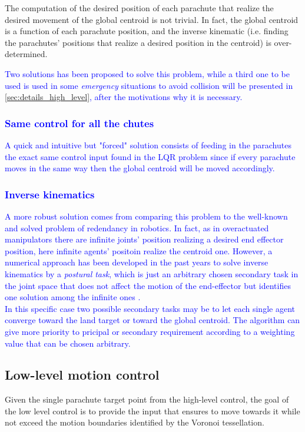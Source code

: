 The computation of the desired position of each parachute that realize the desired movement of the global centroid is not trivial. In fact, the global centroid is a function of each parachute position, and the inverse kinematic (i.e. finding the parachutes' positions that realize a desired position in the centroid) is over-determined. \textcolor{blue}{Two solutions has been proposed to solve this problem, while a third one to be used is used in some \textit{emergency} situations to avoid collision will be presented in \autoref{sec:details_high_level}, after the motivations why it is necessary.
\subsubsection{Same control for all the chutes}
 A quick and intuitive but "forced" solution consists of feeding in the parachutes the exact same control input found in the LQR problem since if every parachute moves in the same way then the global centroid will be moved accordingly.
 \subsubsection{Inverse kinematics}
  A more robust solution comes from comparing this problem to the well-known and solved problem of redendancy in robotics. In fact, as in overactuated manipulators there are infinite joints' position realizing a desired end effector position, here infinite agents' positoin realize the centroid one. However, a numerical approach has been developed in the past years to solve inverse kinematics by a \textit{postural task}, which is just an arbitrary chosen secondary task in the joint space that does not affect the motion of the end-effector  but identifies one solution among the infinite ones \cite{b5} \cite{b6}.\\
In this specific case two possible secondary tasks may be to let each single agent converge toward the land target or toward the global centroid. The algorithm can give more priority to pricipal or secondary requirement  according to a weighting value that can be chosen arbitrary.}

\subsection{Low-level motion control}
Given the single parachute target point from the high-level control, the goal of the low level control is to provide the input that ensures to move towards it while not exceed the motion boundaries identified by the Voronoi tessellation. 

